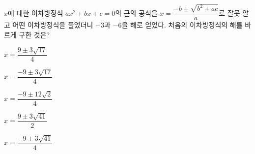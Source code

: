 $x$에 대한 이차방정식 $ax^2+bx+c=0$의 근의 공식을 $x=\dfrac{-b\pm\sqrt{b^2+ac}}{a}$로 잘못 알고 어떤 이차방정식을 풀었더니 $-3$과 $-6$을 해로 얻었다. 처음의 이차방정식의 해를 바르게 구한 것은?
\begin{choicesii}{\rule[-3ex]{0pt}{8ex}$x=\dfrac{9\pm 3\sqrt{17}}{4}$}{\rule[-3ex]{0pt}{8ex}$x=\dfrac{-9\pm 3\sqrt{17}}{4}$}{\rule[-3ex]{0pt}{8ex}$x=\dfrac{-9\pm 12\sqrt{2}}{4}$}{\rule[-3ex]{0pt}{8ex}$x=\dfrac{9\pm 3\sqrt{41}}{2}$}{\rule[-3ex]{0pt}{8ex}$x=\dfrac{-9\pm 3\sqrt{41}}{4}$}\end{choicesii}
